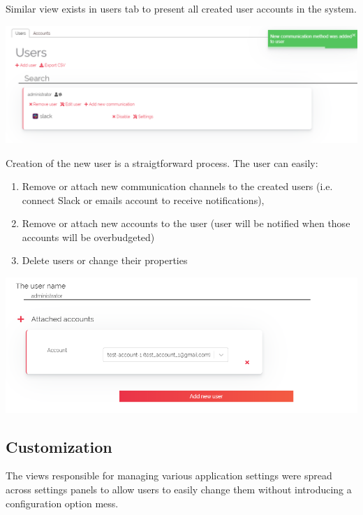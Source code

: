 \documentclass[licencjacka,en]{thesisclass}
\begin{document}
    Similar view exists in users tab to present all created user accounts in the system.
    
    \includegraphics[width=\textwidth] {imgs/screenshots/screen_users_browse.png}
    
    Creation of the new user is a straigtforward process. The user can easily:
    \begin{enumerate}
        \item Remove or attach new communication channels to the created users (i.e. connect Slack or emails account to receive notifications),
        \item Remove or attach new accounts to the user (user will be notified when those accounts will be overbudgeted)
        \item Delete users or change their properties
    \end{enumerate}
    
    \includegraphics[width=\textwidth] {imgs/screenshots/screen_users_create.png}
    
    \subsection{Customization}
    
    The views responsible for managing various application settings were spread across settings panels to allow users to easily change them without introducing a configuration option mess.
    
\end{document}

